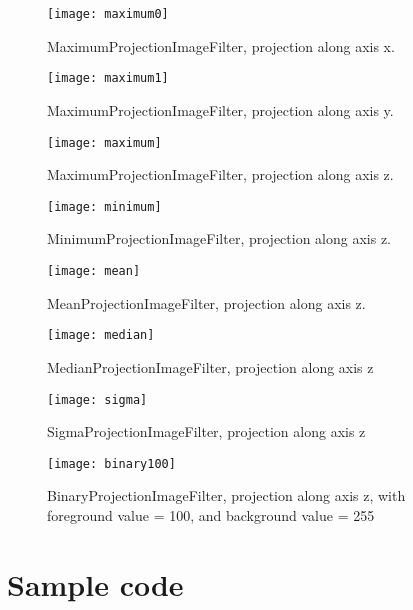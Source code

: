 \documentclass{InsightArticle}
\begin{document}
\begin{figure}[htbp]
\centering
\texttt{[image: maximum0]}
\caption{MaximumProjectionImageFilter, projection along axis x.\label{maximum0}}
\end{figure}

\begin{figure}[htbp]
\centering
\texttt{[image: maximum1]}
\caption{MaximumProjectionImageFilter, projection along axis y.\label{maximum1}}
\end{figure}

\begin{figure}[htbp]
\centering
\texttt{[image: maximum]}
\caption{MaximumProjectionImageFilter, projection along axis z.\label{maximum}}
\end{figure}

\begin{figure}[htbp]
\centering
\texttt{[image: minimum]}
\caption{MinimumProjectionImageFilter, projection along axis z.\label{minimum}}
\end{figure}

\begin{figure}[htbp]
\centering
\texttt{[image: mean]}
\caption{MeanProjectionImageFilter, projection along axis z.\label{mean}}
\end{figure}

\begin{figure}[htbp]
\centering
\texttt{[image: median]}
\caption{MedianProjectionImageFilter, projection along axis z\label{median}}
\end{figure}

\begin{figure}[htbp]
\centering
\texttt{[image: sigma]}
\caption{SigmaProjectionImageFilter, projection along axis z\label{sigma}}
\end{figure}

\begin{figure}[htbp]
\centering
\texttt{[image: binary100]}
\caption{BinaryProjectionImageFilter, projection along axis z, with foreground value = 100, and background value = 255\label{binary100}}
\end{figure}

\section{Sample code}
\end{document}
